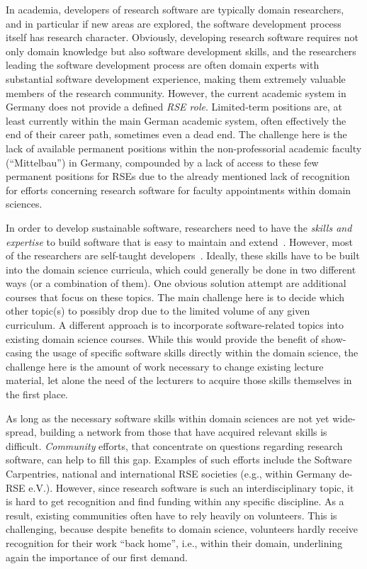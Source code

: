 \documentclass[a4paper,num-refs,numbers,sort&compress]{de-rse}
\begin{document}
In academia, developers of research software are typically domain researchers, and in particular if new areas are explored, the software development process itself has research character.
Obviously, developing research software requires not only domain knowledge but also software development skills, and the researchers leading the software development process are often domain experts with substantial software development experience, making them extremely valuable members of the research community.
However, the current academic system in Germany does not provide a defined \textit{RSE role}.
Limited-term positions are, at least currently within the main German academic system, often effectively the end of their career path, sometimes even a dead end.
The challenge here is the lack of available permanent positions within the non-professorial academic faculty (``Mittelbau'') in Germany, compounded by a lack of access to 
these few permanent positions for RSEs due to the already mentioned lack of recognition for efforts concerning research software for faculty appointments within domain sciences.

In order to develop sustainable software, researchers need to have the \textit{skills and expertise} to build software that is easy to maintain and extend~\cite{carver2016software}.
However, most of the researchers are self-taught developers~\cite{Wilson2014,SSIanalysis}.
Ideally, these skills have to be built into the domain science curricula, which could generally be done in two different ways (or a combination of them).
One obvious solution attempt are additional courses that focus on these topics.
The main challenge here is to decide which other topic(s) to possibly drop due to the limited volume of any given curriculum.
A different approach is to incorporate software-related topics into existing domain science courses.
While this would provide the benefit of show-casing the usage of specific software skills directly within the domain science, the challenge here is the amount of work necessary to change existing lecture material, let alone the need of the lecturers to acquire those skills themselves in the first place.

As long as the necessary software skills within domain sciences are not yet wide-spread, building a network from those that have acquired relevant skills is difficult.
\textit{Community} efforts, that concentrate on questions regarding research software, can help to fill this gap.
Examples of such efforts include the Software Carpentries, national and international RSE societies (e.g., within Germany de-RSE e.V.).
However, since research software is such an interdisciplinary topic, it is hard to get recognition and find funding within any specific discipline.
As a result, existing communities often have to rely heavily on volunteers.
This is challenging, because despite benefits to domain science, volunteers hardly receive recognition for their work ``back home'', i.e., within their domain, underlining again the importance of our first demand.
\end{document}
